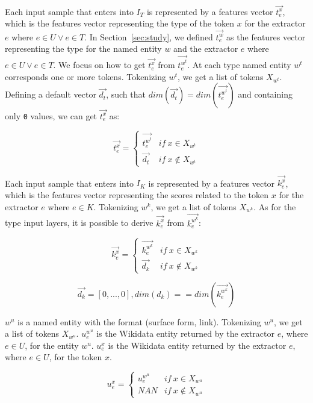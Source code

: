 \documentclass{llncs}
\newcommand{\secref}[1]{\mbox{Section~\ref{#1}}}
\begin{document}
Each input sample that enters into $I_T$  is represented by a features vector $\vec{t^{x}_{e}}$, which is the features vector representing the type of the token $x$ for the extractor $e$ where $e \in U \lor e \in T$. In \secref{sec:study}, we defined $\vec{t^{w}_{e}}$ as the features vector representing the type for the named entity $w$ and the extractor $e$ where $e \in U \lor e \in T$. We focus on how to get $\vec{t^{x}_{e}}$ from $\vec{t^{w^{t}}_{e}}$. At each type named entity $w^{t}$ corresponds one or more tokens. Tokenizing $w^{t}$, we get a list of tokens $X_{w^{t}}$. Defining a default vector $\vec{d_t}$, such that $dim(\vec{d_t}) = dim(\vec{t^{w^{t}}_{e}})$  and containing only \texttt{0} values, we can get $\vec{t^{x}_{e}}$ as:

\begin{equation} \label{eq:type_feat}
\vec{t^{x}_{e}} = \left\{\begin{matrix} 
\vec{t^{w^{t}}_{e}} & if \: x \in X_{w^{t}}\\
\vec{d_t} & if \: x \notin X_{w^{t}}
\end{matrix}\right.
\end{equation}

Each input sample that enters into $I_K$  is represented by a features vector $\vec{k^{x}_{e}}$, which is the features vector representing the scores related to the token $x$ for the extractor $e$ where $e \in K$. Tokenizing $w^{k}$, we get a list of tokens $X_{w^{k}}$.
As for the type input layers, it is possible to derive $\vec{k^{x}_{e}}$ from $\vec{k^{w^{k}}_{e}}$:

\begin{equation} \label{eq:score_feat}
\vec{k^{x}_{e}} = \left\{\begin{matrix} 
\vec{k^{w^{k}}_{e}} & if \: x \in X_{w^{k}}\\
\vec{d_k} & if \: x \notin X_{w^{k}}
\end{matrix}\right.
\end{equation}

$$\vec{d_k} = [0,...,0], dim(d_k) == dim(\vec{k^{w^{k}}_{e}})$$

$w^u$ is a named entity with the format (surface form, link). Tokenizing $w^{u}$, we get a list of tokens $X_{w^{u}}$. $u^{w^{u}}_{e}$ is the Wikidata entity returned by the extractor $e$, where $e \in U$, for the entity $w^u$. $u^{x}_{e}$ is the Wikidata entity returned by the extractor $e$, where $e \in U$, for the token $x$. 

\begin{equation} \label{eq:score_feat}
u^{x}_{e} = \left\{\begin{matrix} 
u^{w^{u}}_{e} & if \: x \in X_{w^{u}}\\
NAN & if \: x \notin X_{w^{u}}
\end{matrix}\right.
\end{equation}
\end{document}
